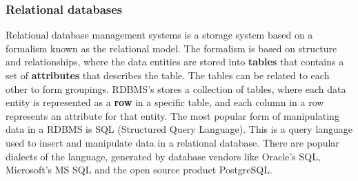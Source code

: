 \subsubsection{Relational databases}
Relational database management systems is a storage system based on a formalism known as the relational model. The formalism is based on structure and relationships, where the data entities are stored into \textbf{tables} that contains a set of \textbf{attributes} that describes the table. The tables can be related to each other to form groupings. RDBMS's stores a collection of tables, where each data entity is represented as a \textbf{row} in a specific table, and each column in a row represents an attribute for that entity. The most popular form of manipulating data in a RDBMS is SQL (Structured Query Language).\cite{sql} This is a query language used to insert and manipulate data in a relational database. There are popular dialects of the language, generated by database vendors like Oracle's SQL,\cite{oracle} Microsoft's MS SQL\cite{mssql}  and the open source product PostgreSQL.\cite{postgresql} 

